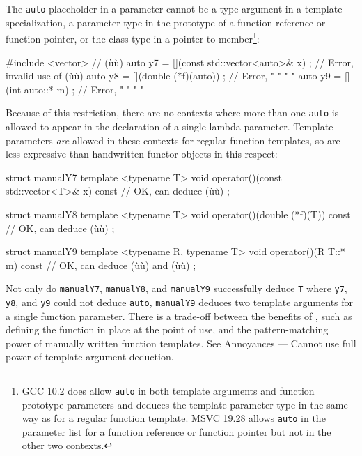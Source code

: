{The \lstinline!auto! placeholder in a  parameter
cannot be a type argument in a template specialization, a parameter type
in the prototype of a function reference or function pointer, or the
class type in a pointer to member{\cprotect\footnote{GCC 10.2 does allow
\lstinline!auto! in both template arguments and function prototype
parameters and deduces the template parameter type in the same way as
for a regular function template. MSVC 19.28 allows \lstinline!auto! in
the parameter list for a function reference or function pointer but
  not in the other two contexts.}}:

\begin{emcppslisting}
#include <vector>  // (ù{}ù)
auto y7 = [](const std::vector<auto>& x) { };  // Error, invalid use of (ù{}ù)
auto y8 = [](double (*f)(auto)) { };           // Error,    "     "   "    "
auto y9 = [](int auto::* m) { };               // Error,    "     "   "    "
\end{emcppslisting}
    

\noindent Because of this restriction, there are no contexts where more than one
\lstinline!auto! is allowed to appear in the declaration of a single lambda
parameter. Template parameters \emph{are} allowed in these contexts for
regular function templates, so  are less
expressive than handwritten functor objects in this respect:

\begin{emcppslisting}
struct manualY7
{
    template <typename T>
    void operator()(const std::vector<T>& x) const { }  // OK, can deduce (ù{}ù)
};

struct manualY8
{
    template <typename T>
    void operator()(double (*f)(T)) const { }  // OK, can deduce (ù{}ù)
};

struct manualY9
{
    template <typename R, typename T>
    void operator()(R T::* m) const { }  // OK, can deduce (ù{}ù) and (ù{}ù)
};
\end{emcppslisting}
    

\noindent Not only do \lstinline!manualY7!, \lstinline!manualY8!, and \lstinline!manualY9!
successfully deduce \lstinline!T! where \lstinline!y7!, \lstinline!y8!, and
\lstinline!y9! could not deduce \lstinline!auto!, \lstinline!manualY9! deduces
two template arguments for a single function parameter. There is a
trade-off between the benefits of , such as
defining the function in place at the point of use, and the
pattern-matching power of manually written function templates. See
{Annoyances --- Cannot use full power of template-argument deduction}.

}
